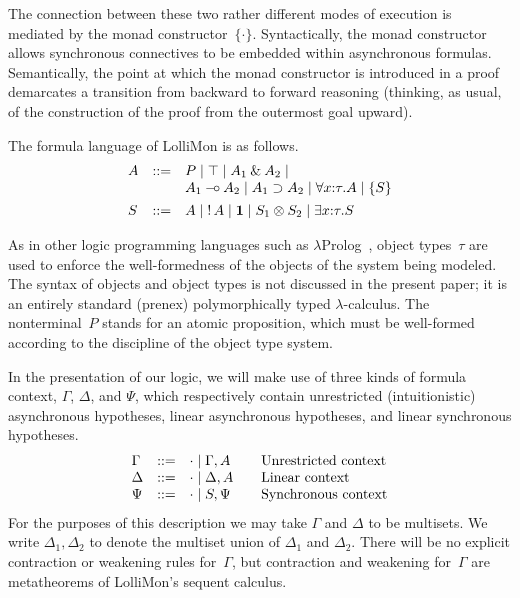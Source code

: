 \documentclass{sig-alt}
\begin{document}
The connection between these two rather different modes of execution is
mediated by the monad constructor~$\{\cdot\}$. Syntactically, the monad
constructor allows synchronous connectives to be embedded within
asynchronous formulas. Semantically, the point at which the monad
constructor is introduced in a proof demarcates a transition from
backward to forward reasoning (thinking, as usual, of the construction
of the proof from the outermost goal upward).

The formula language of LolliMon is as follows.
$$
\begin{array}{lll}
A & ::= &  P 
      \mid \top 
      \mid A_1 \mathbin{\&} A_2 
      \mid \\&& A_1 \mathbin{-\hspace{-0.70mm}\circ} A_2 
      \mid A_1 \supset A_2 
      \mid \forall x{:}\tau.A  
      \mid \{ S \} 
\\[1ex]
S & ::= &  A
      \mid \mathop{!} A
      \mid \textbf{1} 
      \mid S_1 \otimes S_2 
      \mid \exists x{:}\tau.S 
\end{array}
$$

As in other logic programming languages such as
$\lambda$Prolog~\cite{Miller86iclp}, object types~$\tau$ are used to
enforce the well-formedness of the objects of the system being
modeled.
The syntax of objects and object types is not discussed in the present
paper; it is an entirely standard (prenex) polymorphically typed
$\lambda$-calculus.  The nonterminal~$P$ stands for an atomic proposition,
which must be well-formed according to the discipline of the object type system.

In the presentation of our logic, we will make use of three kinds of
formula context, $\Gamma$, $\Delta$, and $\Psi$, which respectively contain unrestricted
(intuitionistic) asynchronous hypotheses, linear asynchronous
hypotheses, and linear synchronous hypotheses.
$$
\begin{array}{lll@{\qquad}l}
  \Gamma & ::= & \cdot \mid \Gamma, A & \mbox{Unrestricted context}\\
  \Delta & ::= & \cdot \mid \Delta, A & \mbox{Linear context}\\
  \Psi   & ::= & \cdot \mid S, \Psi & \mbox{Synchronous context}\\
\end{array}
$$
For the purposes of this description we may take $\Gamma$ and
$\Delta$ to be multisets. We write $\Delta_1,\Delta_2$ to
denote the multiset union of $\Delta_1$ and $\Delta_2$.
There will be no explicit contraction or weakening rules for~$\Gamma$,
but contraction and weakening for~$\Gamma$ are metatheorems of LolliMon's
sequent calculus.
\end{document}
